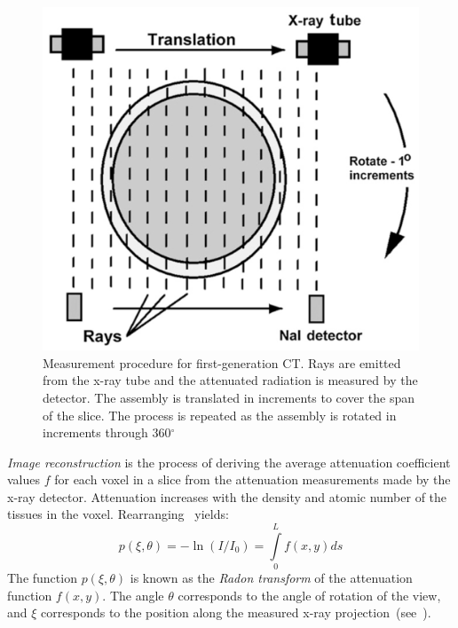 \begin{figure}[ht]
\centering
		\includegraphics[scale=0.3]{media/0-imaging/ct2.png}
%
\caption{Measurement procedure for first-generation CT. Rays are emitted from the x-ray tube and the attenuated radiation is measured by the detector. The assembly is translated in increments to cover the span of the slice. The process is repeated as the assembly is rotated in increments through 360$^{\circ}$~\cite{goldman_2007}}
\label{fig:ct2}
\end{figure}

\textit{Image reconstruction} is the process of deriving the average attenuation coefficient values $f$ for each voxel in a slice from the attenuation measurements made by the x-ray detector. Attenuation increases with the density and atomic number of the tissues in the voxel. Rearranging~ yields:
\begin{equation}
p(\xi, \theta) = -\ln(I/I_0) = \int\limits_{0}^{L}f(x,y) ds
\end{equation}
The function $p(\xi,\theta)$ is known as the \textit{Radon transform} of the attenuation function $f(x,y)$. The angle $\theta$ corresponds to the angle of rotation of the view, and $\xi$ corresponds to the position along the measured x-ray projection~(see~).

